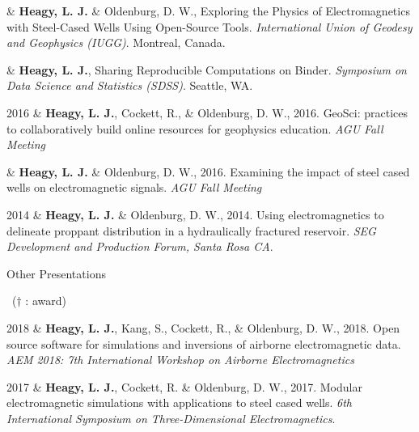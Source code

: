 \documentclass[a4paper, 11pt]{article}
\newcommand{\subheading}[1]{
    \vspace{0.4cm}
    {\Large #1}\\
    \vspace{-0.2cm}
}
\begin{document}
\begin{entryright}
& \textbf{Heagy, L. J.} \& Oldenburg, D. W., Exploring the Physics of Electromagnetics with Steel-Cased Wells Using Open-Source Tools. \emph{International Union of Geodesy and Geophysics (IUGG)}. Montreal, Canada.
\end{entryright}

\begin{entryright}
&  \textbf{Heagy, L. J.}, Sharing Reproducible Computations on Binder. \emph{Symposium on Data Science and Statistics (SDSS)}. Seattle, WA.
\end{entryright}


\begin{entryright}
2016 & \textbf{Heagy, L. J.}, Cockett, R., \& Oldenburg, D. W., 2016. GeoSci: practices to collaboratively build online resources for geophysics education. \emph{AGU Fall Meeting}
\end{entryright}

\begin{entryright}
& \textbf{Heagy, L. J.} \& Oldenburg, D. W., 2016. Examining the impact of steel cased wells on electromagnetic signals. \emph{AGU Fall Meeting}
\end{entryright}


\begin{entryright}
2014 & \textbf{Heagy, L. J.} \& Oldenburg, D. W., 2014. Using electromagnetics to delineate proppant distribution in a hydraulically fractured reservoir. \emph{SEG Development and Production Forum, Santa Rosa CA}.
\end{entryright}

\subheading{Other Presentations}
\vspace{0.3cm}
~($\dagger$ : award)
\vspace{0.3cm}
\begin{entryright}
2018 & \textbf{Heagy, L. J.}, Kang, S., Cockett, R., \& Oldenburg, D. W., 2018. Open source software for simulations and inversions of airborne electromagnetic data. \emph{AEM 2018: 7th International Workshop on Airborne Electromagnetics}
\end{entryright}

\begin{entryright}
2017 & \textbf{Heagy, L. J.}, Cockett, R. \& Oldenburg, D. W., 2017. Modular electromagnetic simulations with applications to steel cased wells. \emph{6th International Symposium on Three-Dimensional Electromagnetics}.
\end{entryright}
\end{document}

